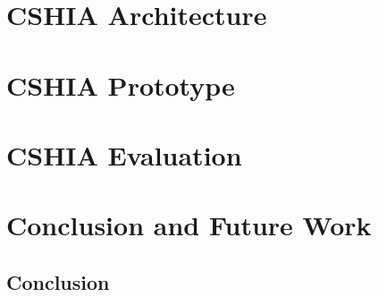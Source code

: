 \documentclass[Ingles,Final]{ic-tese-v3}
\begin{document}
\chapter{CSHIA  Architecture}
\label{chap:cshia_architecture}


\chapter{CSHIA  Prototype}
\label{chap:cshia_prototype}


\chapter{CSHIA  Evaluation}
\label{chap:cshia:evaluation}


\chapter{Conclusion and Future Work}
\label{chap:conclusion}
    \section{Conclusion}
    \label{sec:conclusion}





\appendix

%     
% 
\end{document}
